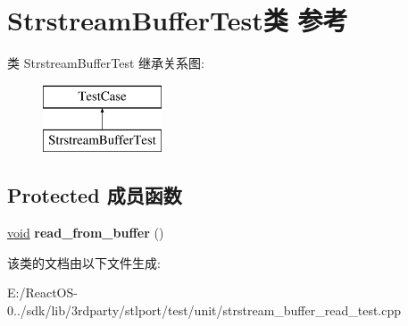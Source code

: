 \hypertarget{class_strstream_buffer_test}{}\section{Strstream\+Buffer\+Test类 参考}
\label{class_strstream_buffer_test}
类 Strstream\+Buffer\+Test 继承关系图\+:\begin{figure}[H]
\begin{center}
\leavevmode
\includegraphics[height=2.000000cm]{class_strstream_buffer_test}
\end{center}
\end{figure}
\subsection*{Protected 成员函数}
\begin{DoxyCompactItemize}
\item 
\mbox{\label{class_strstream_buffer_test_ad2830a2d2aa3e09c76fff7fb2d95f8d5}} 
\hyperlink{interfacevoid}{void} {\bfseries read\+\_\+from\+\_\+buffer} ()
\end{DoxyCompactItemize}


该类的文档由以下文件生成\+:\begin{DoxyCompactItemize}
\item 
E\+:/\+React\+O\+S-\/0../sdk/lib/3rdparty/stlport/test/unit/strstream\+\_\+buffer\+\_\+read\+\_\+test.\+cpp\end{DoxyCompactItemize}
